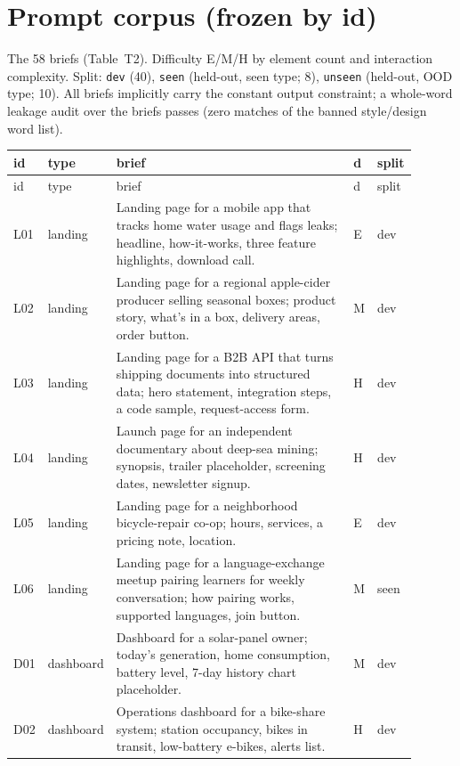 \section{Prompt corpus (frozen by id)}
\label{app:corpus}

The 58 briefs (Table~T2). Difficulty E/M/H by element count and interaction complexity. Split:
\texttt{dev} (40), \texttt{seen} (held-out, seen type; 8), \texttt{unseen} (held-out, OOD type; 10).
All briefs implicitly carry the constant output constraint; a whole-word leakage audit over the briefs
passes (zero matches of the banned style/design word list).

\begin{small}
\begin{longtable}{@{}p{0.045\linewidth}p{0.075\linewidth}p{0.70\linewidth}p{0.02\linewidth}p{0.055\linewidth}@{}}
\toprule
id & type & brief & d & split \\
\midrule
\endfirsthead
\toprule id & type & brief & d & split \\ \midrule \endhead
\bottomrule \endfoot
L01 & landing & Landing page for a mobile app that tracks home water usage and flags leaks; headline, how-it-works, three feature highlights, download call. & E & dev \\
L02 & landing & Landing page for a regional apple-cider producer selling seasonal boxes; product story, what's in a box, delivery areas, order button. & M & dev \\
L03 & landing & Landing page for a B2B API that turns shipping documents into structured data; hero statement, integration steps, a code sample, request-access form. & H & dev \\
L04 & landing & Launch page for an independent documentary about deep-sea mining; synopsis, trailer placeholder, screening dates, newsletter signup. & H & dev \\
L05 & landing & Landing page for a neighborhood bicycle-repair co-op; hours, services, a pricing note, location. & E & dev \\
L06 & landing & Landing page for a language-exchange meetup pairing learners for weekly conversation; how pairing works, supported languages, join button. & M & seen \\
D01 & dashboard & Dashboard for a solar-panel owner; today's generation, home consumption, battery level, 7-day history chart placeholder. & M & dev \\
D02 & dashboard & Operations dashboard for a bike-share system; station occupancy, bikes in transit, low-battery e-bikes, alerts list. & H & dev \\

\end{longtable}
\end{small}
